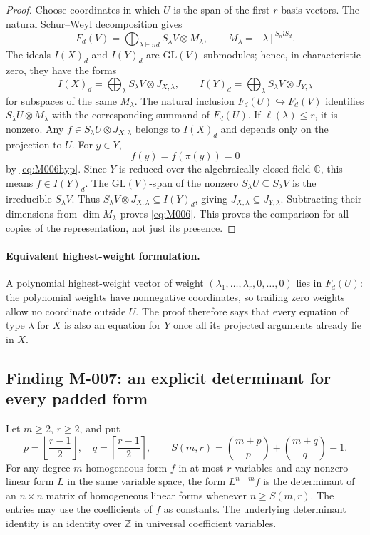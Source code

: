 \begin{proof}
Choose coordinates in which \(U\) is the span of the first \(r\)
basis vectors. The natural Schur--Weyl decomposition gives
\[
 F_d(V)=\bigoplus_{\lambda\vdash nd} S_\lambda V\otimes M_\lambda,
 \qquad
 M_\lambda=[\lambda]^{S_n\wr S_d}.
\]
The ideals \(I(X)_d\) and \(I(Y)_d\) are
\(\mathrm{GL}(V)\)-submodules; hence, in characteristic zero, they
have the forms
\[
 I(X)_d=\bigoplus_\lambda S_\lambda V\otimes J_{X,\lambda},
 \qquad
 I(Y)_d=\bigoplus_\lambda S_\lambda V\otimes J_{Y,\lambda}
\]
for subspaces of the same \(M_\lambda\).
The natural inclusion \(F_d(U)\hookrightarrow F_d(V)\) identifies
\(S_\lambda U\otimes M_\lambda\) with the corresponding summand
of \(F_d(U)\). If \(\ell(\lambda)\leq r\), it is nonzero.
Any \(f\in S_\lambda U\otimes J_{X,\lambda}\) belongs to \(I(X)_d\)
and depends only on the projection to \(U\). For \(y\in Y\),
\[
                              f(y)=f(\pi(y))=0
\]
by \eqref{eq:M006hyp}. Since \(Y\) is reduced over the algebraically
closed field \(\mathbb C\), this means \(f\in I(Y)_d\).
The \(\mathrm{GL}(V)\)-span of the nonzero
\(S_\lambda U\subseteq S_\lambda V\) is the irreducible
\(S_\lambda V\). Thus
\(S_\lambda V\otimes J_{X,\lambda}\subseteq I(Y)_d\), giving
\(J_{X,\lambda}\subseteq J_{Y,\lambda}\).
Subtracting their dimensions from \(\dim M_\lambda\) proves
\eqref{eq:M006}. This proves the comparison for all copies of the
representation, not just its presence.
\end{proof}

\paragraph{Equivalent highest-weight formulation.}
A polynomial highest-weight vector of weight
\((\lambda_1,\ldots,\lambda_r,0,\ldots,0)\) lies in \(F_d(U)\):
the polynomial weights have nonnegative coordinates, so trailing
zero weights allow no coordinate outside \(U\).
The proof therefore says that every equation of type \(\lambda\)
for \(X\) is also an equation for \(Y\) once all its projected
arguments already lie in \(X\).

\subsection*{Finding M-007: an explicit determinant for every padded form}
Let \(m\geq2\), \(r\geq2\), and put
\[
 p=\left\lfloor\frac{r-1}{2}\right\rfloor,\quad
 q=\left\lceil\frac{r-1}{2}\right\rceil,\qquad
 S(m,r)=\binom{m+p}{p}+\binom{m+q}{q}-1.
\]
For any degree-\(m\) homogeneous form \(f\) in at most \(r\)
variables and any nonzero linear form \(L\) in the same variable
space, the form \(L^{n-m}f\) is the determinant of an \(n\times n\)
matrix of homogeneous linear forms whenever \(n\geq S(m,r)\).
The entries may use the coefficients of \(f\) as constants.
The underlying determinant identity is an identity over
\(\mathbb Z\) in universal coefficient variables.

